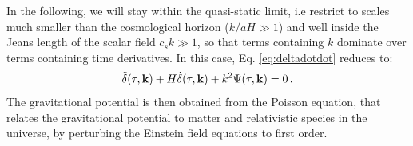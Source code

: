 




In the following, we will stay within the quasi-static
limit, i.e restrict to scales much smaller than the cosmological horizon
($k/aH\gg1$) and well inside the Jeans length of the scalar field
$c_{s}k\gg1$, so that terms containing $k$ dominate over terms containing
time derivatives. In this case, Eq. \ref{eq:deltadotdot} reduces
to: 
\begin{equation}
\ddot{\delta}(\tau,\mathbf{k})+H\dot{\delta}(\tau,\mathbf{k})+k^{2}\Psi(\tau,\mathbf{k})=0\,.\label{eq:growth-rate-Psi}
\end{equation}
The gravitational potential is then obtained from the Poisson equation,
that relates the gravitational potential to matter and relativistic
species in the universe, by perturbing the Einstein field equations
to first order.

